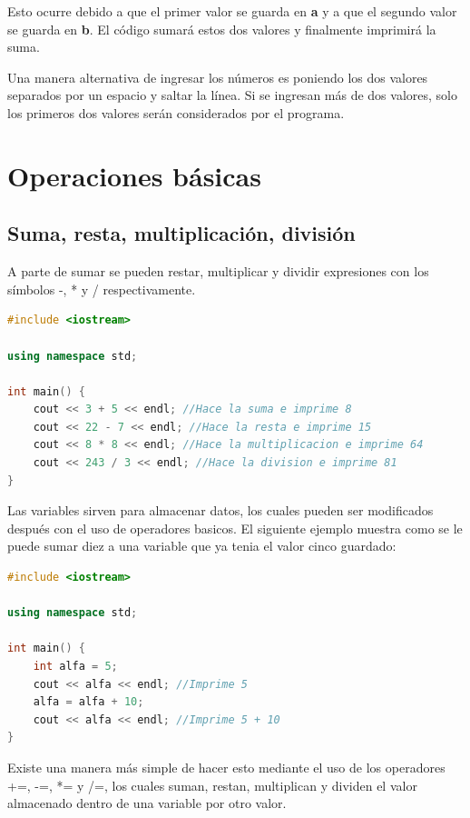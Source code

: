 \documentclass{article}
\begin{document}
Esto ocurre debido a que el primer valor se guarda en \textbf{a} y a que el segundo valor se guarda en \textbf{b}. El código sumará estos dos valores y finalmente imprimirá la suma.

Una manera alternativa de ingresar los números es poniendo los dos valores separados por un espacio y saltar la línea. Si se ingresan más de dos valores, solo los primeros dos valores serán considerados por el programa.

\section{Operaciones básicas}

\subsection{Suma, resta, multiplicación, división}

A parte de sumar se pueden restar, multiplicar y dividir expresiones con los símbolos -, * y / respectivamente.

\begin{lstlisting}[language=C++, title=Operaciones basicas]
#include <iostream>

using namespace std;

int main() {
	cout << 3 + 5 << endl; //Hace la suma e imprime 8
	cout << 22 - 7 << endl; //Hace la resta e imprime 15
	cout << 8 * 8 << endl; //Hace la multiplicacion e imprime 64
	cout << 243 / 3 << endl; //Hace la division e imprime 81
}
\end{lstlisting}

Las variables sirven para almacenar datos, los cuales pueden ser modificados después con el uso de operadores basicos. El siguiente ejemplo muestra como se le puede sumar diez a una variable que ya tenia el valor cinco guardado:

\begin{lstlisting}[language=C++, title=Operaciones basicas]
#include <iostream>

using namespace std;

int main() {
	int alfa = 5;
	cout << alfa << endl; //Imprime 5
	alfa = alfa + 10;
	cout << alfa << endl; //Imprime 5 + 10
}
\end{lstlisting}

Existe una manera más simple de hacer esto mediante el uso de los operadores +=, -=, *= y /=, los cuales suman, restan, multiplican y dividen el valor almacenado dentro de una variable por otro valor.
\end{document}
